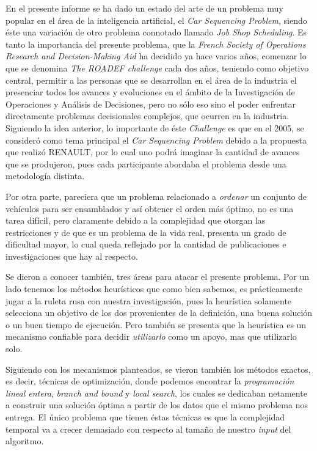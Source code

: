 
En el presente informe se ha dado un estado del arte de un problema muy popular
en el área de la inteligencia artificial, el \emph{Car Sequencing Problem}, siendo éste
una variación de otro problema connotado llamado \emph{Job Shop Scheduling}.
Es tanto la importancia del presente problema, que la \emph{French Society of Operations
Research and Decision-Making Aid} ha decidido ya hace varios años, comenzar lo que se denomina
\emph{The ROADEF challenge} cada dos años, teniendo como objetivo central,  permitir a las personas
que se desarrollan en el área de la industria el presenciar todos los avances y evoluciones
en el ámbito de la Investigación de Operaciones y Análisis de Decisiones, pero no sólo eso
sino el poder enfrentar directamente problemas decisionales complejos, que ocurren en la industria.
Siguiendo la idea anterior, lo importante de éste \emph{Challenge} es que en el 2005, se consideró
como tema principal el \emph{Car Sequencing Problem} debido a la propuesta que realizó RENAULT,
por lo cual uno podrá imaginar la cantidad de avances que se produjeron, pues cada participante
abordaba el problema desde una metodología distinta.

Por otra parte, pareciera que un problema relacionado a \emph{ordenar} un conjunto de vehículos
para ser ensamblados y así obtener el orden más óptimo, no es una tarea difícil, pero claramente
debido a la complejidad que otorgan las restricciones y de que es un problema de la vida real,
presenta un grado de dificultad mayor, lo cual queda reflejado por la cantidad de publicaciones 
e investigaciones que hay al respecto.

Se dieron a conocer también, tres áreas para atacar el presente problema.
Por un lado tenemos los métodos heurísticos que como bien sabemos, es prácticamente jugar a la ruleta
rusa con nuestra investigación, pues la heurística solamente selecciona un objetivo de los dos provenientes
de la definición, una buena solución o un buen tiempo de ejecución. Pero también se presenta que la heurística
es un mecanismo confiable para decidir \emph{utilizarlo} como un apoyo, mas que utilizarlo solo.

Siguiendo con los mecanismos planteados, se vieron también los  métodos exactos,
es decir, técnicas de optimización, donde podemos encontrar la \emph{programación lineal entera},
\emph{branch and bound} y \emph{local search}, los cuales se dedicaban netamente a construir una
solución óptima a partir de los datos que el mismo problema nos entrega. El único problema que tienen
éstas técnicas es que la complejidad temporal va a crecer demasiado con respecto al tamaño de nuestro
\emph{input} del algoritmo.

